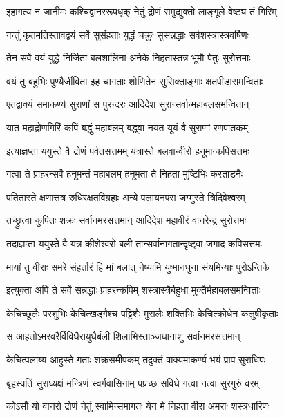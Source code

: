 
\twolineshloka
{इहागत्य न जानीमः कश्चिद्वानररूपधृक्}
{नेतुं द्रोणं समुद्युक्तो लाङ्गूले वेष्ट्य तं गिरिम्}%

\twolineshloka
{गन्तुं कृतमतिस्तावद्वयं सर्वे सुसंहताः}
{युद्धं चक्रुः सुसन्नद्धाः सर्वशस्त्रास्त्रवर्षिणः}%

\twolineshloka
{तेन सर्वे वयं युद्धे निर्जिता बलशालिना}
{अनेके निहतास्तत्र भूमौ पेतुः सुरोत्तमाः}%

\twolineshloka
{वयं तु बहुभिः पुण्यैर्जीविता इह चागताः}
{शोणितेन सुसिक्ताङ्गाः क्षतपीडासमन्विताः}%

\twolineshloka
{एतद्वाक्यं समाकर्ण्य सुराणां स पुरन्दरः}
{आदिदेश सुरान्सर्वान्महाबलसमन्वितान्}%

\twolineshloka
{यात महाद्रोणगिरिं कपिं बद्धुं महाबलम्}
{बद्ध्वा नयत यूयं वै सुराणां रणपातकम्}%

\twolineshloka
{इत्याज्ञप्ता ययुस्ते वै द्रोणं पर्वतसत्तमम्}
{यत्रास्ते बलवान्वीरो हनूमान्कपिसत्तमः}%

\twolineshloka
{गत्वा ते प्राहरन्सर्वे हनूमन्तं महाबलम्}
{हनूमता ते निहता मुष्टिभिः करताडनैः}%

\twolineshloka
{पतितास्ते क्षणात्तत्र रुधिरक्षतविग्रहाः}
{अन्ये पलायनपरा जग्मुस्ते त्रिदिवेश्वरम्}%

\twolineshloka
{तच्छ्रुत्वा कुपितः शक्रः सर्वानमरसत्तमान्}
{आदिदेश महावीरं वानरेन्द्रं सुरोत्तमः}%

\twolineshloka
{तदाज्ञप्ता ययुस्ते वै यत्र कीशेश्वरो बली}
{तान्सर्वानागतान्दृष्ट्वा जगाद कपिसत्तमः}%

\twolineshloka
{मायां तु वीराः समरे संहर्तारं हि मां बलात्}
{नेष्यामि युष्मानधुना संयमिन्याः पुरोऽन्तिके}%

\twolineshloka
{इत्युक्ता अपि ते सर्वे सन्नद्धाः प्राहरन्कपिम्}
{शस्त्रास्त्रैर्बहुधा मुक्तैर्महाबलसमन्विताः}%

\twolineshloka
{केचिच्छूलैः परशुभिः केचित्खड्गैश्च पट्टिशैः}
{मुसलैः शक्तिभिः केचित्क्रोधेन कलुषीकृताः}%

\twolineshloka
{स आहतोऽमरवरैर्विविधैरायुधैर्बली}
{शिलाभिस्ताञ्जघानाशु सर्वानमरसत्तमान्}%

\twolineshloka
{केचित्पलाय्य आहुस्ते गताः शक्रसमीपकम्}
{तदुक्तं वाक्यमाकर्ण्य भयं प्राप सुराधिपः}%

\twolineshloka
{बृहस्पतिं सुराध्यक्षं मन्त्रिणं स्वर्गवासिनाम्}
{पप्रच्छ सविधे गत्वा नत्वा सुरगुरुं वरम्}%


\twolineshloka
{कोऽसौ यो वानरो द्रोणं नेतुं स्वामिन्समागतः}
{येन मे निहता वीरा अमराः शस्त्रधारिणः}%

